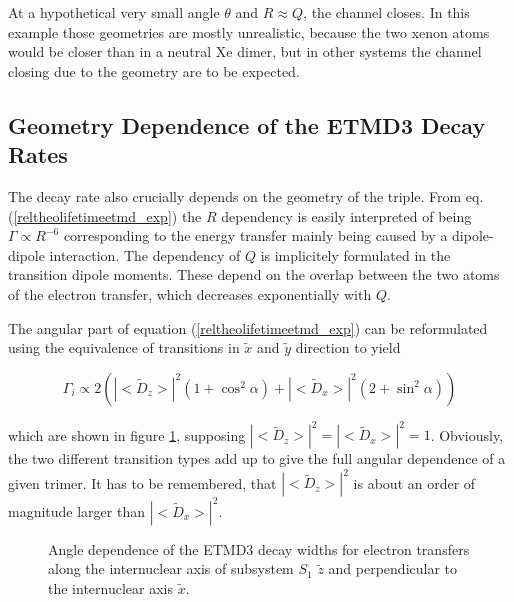 At a hypothetical very small angle $\theta$ and $R\approx Q$, the channel closes.
In this example those geometries are mostly unrealistic, because the two xenon
atoms would be closer than in a neutral Xe dimer, but in other systems the
channel closing due to the geometry are to be expected.


\subsection{Geometry Dependence of the ETMD3 Decay Rates}
The decay rate also crucially depends on the geometry of the triple.
From eq. (\ref{reltheolifetimeetmd_exp}) the $R$ dependency is
easily interpreted of being
$\Gamma \propto R^{-6}$ corresponding to the energy transfer mainly being
caused by a dipole-dipole interaction. The dependency of $Q$ is implicitely
formulated in the transition dipole moments. These depend on the overlap
between the two atoms of the electron transfer, which decreases exponentially
with $Q$.



The angular part of equation (\ref{reltheolifetimeetmd_exp}) can
be reformulated using
the equivalence of transitions in $\tilde{x}$ and $\tilde{y}$ direction to
yield

\begin{equation}
  \Gamma_i \propto 2 \left( |<\tilde{D}_{z}>|^2 (1+\cos^2\alpha)
                           + |<\tilde{D}_x>|^2 (2+ \sin^2\alpha) \right)
\end{equation}

which are shown in figure \ref{figure:etmd_angle_dir}, supposing
$|<\tilde{D}_{z}>|^2 = |<\tilde{D}_x>|^2 = 1$.
Obviously, the two different transition types add up to give the full
angular dependence of a given trimer. It has to be remembered, that
$|<\tilde{D}_{z}>|^2$ is about an order of magnitude larger than
$|<\tilde{D}_{x}>|^2$.

\begin{figure}[th]
 \centering
 
 \caption{Angle dependence of the ETMD3 decay widths for electron transfers
          along the internuclear axis of subsystem $S_1$ $\tilde{z}$ and perpendicular
          to the internuclear axis $\tilde{x}$.}
 \label{figure:etmd_angle_dir}
\end{figure}

